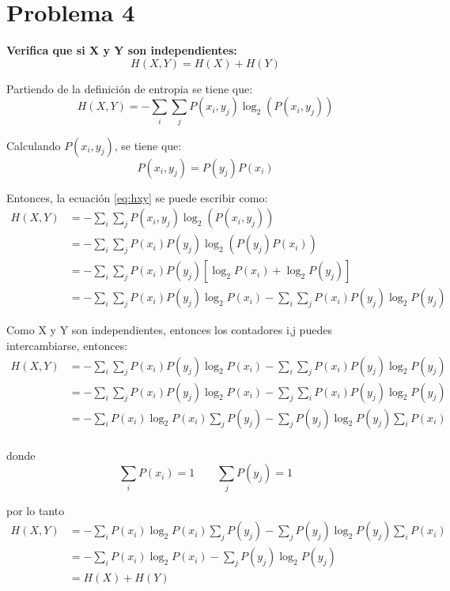 \section*{Problema 4}
\textbf{Verifica que si X y Y son independientes:}
\begin{equation*}
    H(X,Y) = H(X) + H(Y)
\end{equation*}

Partiendo de la definición de entropia se tiene que:
\begin{equation}
    H(X,Y) = - \sum_i \sum_j P(x_i, y_j) \log_2 \left(P(x_i,y_j)\right)
    \label{eq:hxy}
\end{equation}

Calculando $P(x_i,y_j)$, se tiene que:
\begin{equation*}
    P(x_i,y_j)  = P(y_j) P(x_i)
\end{equation*}

Entonces, la ecuación \ref{eq:hxy} se puede escribir como:
\begin{align*}
    H(X,Y) & = - \sum_i \sum_j P(x_i,y_j) \log_2 \left(P(x_i,y_j)\right)                             \\
           & = - \sum_i \sum_j P(x_i)P(y_j) \log_2 \left(P(y_j) P(x_i)\right)                        \\
           & = - \sum_i \sum_j P(x_i)P(y_j) \left[\log_2 P(x_i) + \log_2 P(y_j) \right]              \\
           & = - \sum_i \sum_j P(x_i)P(y_j) \log_2 P(x_i) - \sum_i \sum_j P(x_i)P(y_j) \log_2 P(y_j)
\end{align*}

Como X y Y son independientes, entonces los contadores i,j puedes intercambiarse, entonces:
\begin{align*}
    H(X,Y) & =  - \sum_i \sum_j P(x_i)P(y_j) \log_2 P(x_i) - \sum_i \sum_j P(x_i)P(y_j) \log_2 P(y_j) \\
           & =  - \sum_i \sum_j P(x_i)P(y_j) \log_2 P(x_i) - \sum_j \sum_i P(x_i)P(y_j) \log_2 P(y_j) \\
           & =  - \sum_i P(x_i)\log_2 P(x_i) \sum_j P(y_j) - \sum_j P(y_j)\log_2 P(y_j)\sum_i P(x_i)  \\
\end{align*}

donde
\begin{equation*}
    \sum_i P(x_i) = 1 \qquad \sum_j P(y_j) = 1
\end{equation*}

por lo tanto
\begin{align*}
    H(X,Y) & = - \sum_i P(x_i)\log_2 P(x_i) \sum_j P(y_j) - \sum_j P(y_j)\log_2 P(y_j)\sum_i P(x_i) \\
           & = - \sum_i P(x_i)\log_2 P(x_i) - \sum_j P(y_j)\log_2 P(y_j)                            \\
           & = H(X) + H(Y)
\end{align*}

